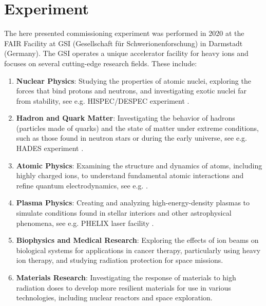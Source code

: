 \section{Experiment}
The here presented commissioning experiment was performed in 2020 at the FAIR Facility at GSI (Gesellschaft f\"ur Schwerionenforschung) in Darmstadt (Germany). The GSI operates a unique accelerator facility for heavy ions and focuses on several cutting-edge research fields. These include:\newline
\begin{enumerate}
\item \textbf{Nuclear Physics}: Studying the properties of atomic nuclei, exploring the forces that bind protons and neutrons, and investigating exotic nuclei far from stability, see e.g. HISPEC/DESPEC experiment \cite{gerl2009nuclear}.
\item \textbf{Hadron and Quark Matter}: Investigating the behavior of hadrons (particles made of quarks) and the state of matter under extreme conditions, such as those found in neutron stars or during the early universe, see e.g. HADES experiment \cite{galatyuk2014hades}.
\item \textbf{Atomic Physics}: Examining the structure and dynamics of atoms, including highly charged ions, to understand fundamental atomic interactions and refine quantum electrodynamics, see e.g. \cite{kluge2008hitrap}.
\item \textbf{Plasma Physics}: Creating and analyzing high-energy-density plasmas to simulate conditions found in stellar interiors and other astrophysical phenomena, see e.g. PHELIX laser facility \cite{major2024high}.
\item \textbf{Biophysics and Medical Research}: Exploring the effects of ion beams on biological systems for applications in cancer therapy, particularly using heavy ion therapy, and studying radiation protection for space missions.
\item \textbf{Materials Research}: Investigating the response of materials to high radiation doses to develop more resilient materials for use in various technologies, including nuclear reactors and space exploration.
\end{enumerate}
